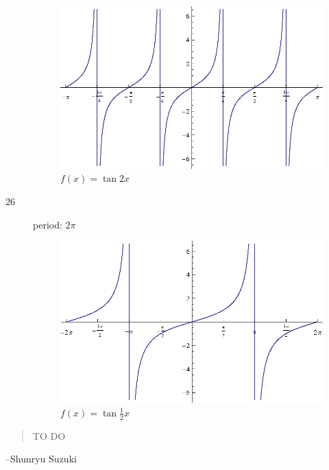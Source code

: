 \documentclass{exam}
\begin{document}
\begin{description}
        \begin{figure}[H]
          \centering
          \includegraphics[scale=0.8]{exercise25.eps}
          \caption{$f(x) = \tan 2x $}
        \end{figure}

      \item[26]
        period: $2 \pi$

        \begin{figure}[H]
          \centering
          \includegraphics[scale=0.8]{exercise26.eps}
          \caption{$f(x) = \tan \frac{1}{2} x $}
        \end{figure}


    \end{description}
  \else
    \vspace{1 cm}
    \begin{quote}
      \begin{em}
        TO DO
      \end{em}
    \end{quote}
    \hspace{1 cm} --Shunryu Suzuki
  \fi
\end{document}
